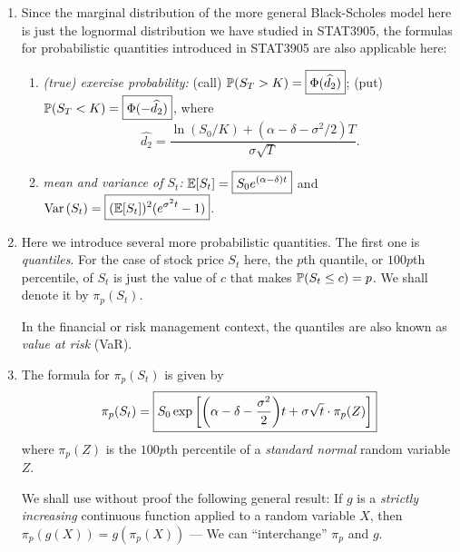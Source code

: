 \begin{enumerate}
\item Since the marginal distribution of the more general Black-Scholes model
here is just the lognormal distribution we have studied in STAT3905, the
formulas for probabilistic quantities introduced in STAT3905 are also
applicable here:
\begin{enumerate}
\item\label{it:bs-ex-prob} \emph{(true) exercise probability:} (call)
\(\mathbb{P}\qty(S_T>K)=\boxed{\Phi(\widehat{d_2})}\); (put)
\(\mathbb{P}\qty(S_T<K)=\boxed{\Phi(-\widehat{d_2})}\), where
\[
\widehat{d_2}=\frac{\ln(S_0/K)+(\alpha-\delta-\sigma^2/2)T}{\sigma\sqrt{T}}.
\]
\item \label{it:bs-mean-var-stock-price} \emph{mean and variance of \(S_t\):}
\(\mathbb{E}\qty[S_t]=\boxed{S_0e^{(\alpha-\delta)t}}\) and
\(\operatorname{Var}\qty(S_t)=\boxed{(\mathbb{E}\qty[S_t])^{2}(e^{\sigma^{2} t}-1)}\).
\end{enumerate}

\item Here we introduce several more probabilistic quantities. The first one is
\emph{quantiles}. For the case of stock price \(S_t\) here, the \(p\)th
quantile, or \(100p\)th percentile, of \(S_t\) is just the value of \(c\) that
makes \(\mathbb{P}\qty(S_t\le c)=p\). We shall denote it by
\(\pi_{p}(S_t)\).

\begin{note}
In the financial or risk management context, the quantiles are also known as
\emph{value at risk} (VaR).
\end{note}

\item \label{it:bs-stock-price-quantile-fmla} The formula for \(\pi_{p}(S_t)\)
is given by
\[
\pi_{p}(S_t)=\boxed{S_0\exp\qty[\qty(\alpha-\delta-\frac{\sigma^2}{2})t + \sigma\sqrt{t}\cdot \pi_{p}(Z)]}
\]
where \(\pi_{p}(Z)\) is the \(100p\)th percentile of a \emph{standard normal}
random variable \(Z\).

\begin{pf}
We shall use without proof the following general result: If \(g\) is a
\emph{strictly increasing} continuous function applied to a random variable
\(X\), then \(\pi_{p}(g(X))=g(\pi_{p}(X))\) --- We can ``interchange''
\(\pi_{p}\) and \(g\).


\end{pf}
\end{enumerate}
